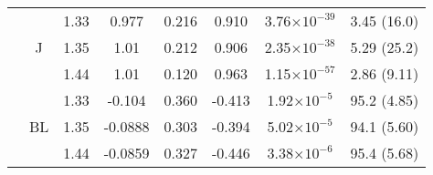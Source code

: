 \begin{table}[htb!]
\begin{tabular}{|ccc|ccccc|}
        \cline{2-8}
        & \multirow{3}{*}{J} & 1.33 & 0.977 & 0.216 & 0.910 & 3.76$\times 10^{-39}$ & 3.45 (16.0) \\
        & & 1.35 & 1.01 & 0.212 & 0.906 & 2.35$\times 10^{-38}$ & 5.29 (25.2) \\
        & & 1.44 & 1.01 & 0.120 & 0.963 & 1.15$\times 10^{-57}$ & 2.86 (9.11) \\
        \cline{2-8}
        & \multirow{3}{*}{BL} & 1.33 & -0.104 & 0.360 & -0.413 & 1.92$\times 10^{-5}$ & 95.2 (4.85) \\
        & & 1.35 & -0.0888 & 0.303 & -0.394 & 5.02$\times 10^{-5}$ & 94.1 (5.60) \\
        & & 1.44 & -0.0859 & 0.327 & -0.446 & 3.38$\times 10^{-6}$ & 95.4 (5.68) \\
        \hline
    \end{tabular}    \label{tb:singleparamtrendsfull}
\end{table}
\FloatBarrier


